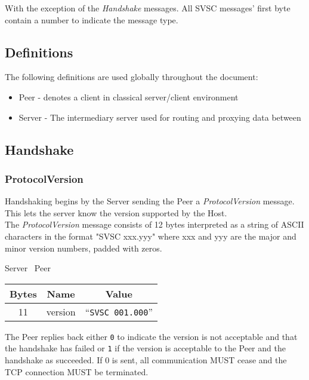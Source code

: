\documentclass{article}
\begin{document}
    With the exception of the \emph{Handshake} messages. All SVSC messages' first byte contain a number to indicate
    the message type.

    \subsection{Definitions}
    The following definitions are used globally throughout the document:

    \begin{itemize}
        \item Peer - denotes a client in classical server/client environment
        \item Server - The intermediary server used for routing and proxying data between
    \end{itemize}

    \subsection{Handshake}

    \subsubsection{ProtocolVersion}

    Handshaking begins by the Server sending the Peer a \emph{ProtocolVersion} message. This lets the server know
    the version supported by the Host.\\

    The \emph{ProtocolVersion} message consists of 12 bytes interpreted as a string of ASCII characters in the format
    "SVSC xxx.yyy" where xxx and yyy are the major and minor version numbers, padded with zeros.

    \begin{center}
        Server \textrightarrow\ Peer\\
        \begin{tabular}{|c|c|c|}
            \hline
            \textbf{Bytes} & \textbf{Name} & \textbf{Value}            \\
            \hline
            11             & version       & ``\texttt{SVSC 001.000}'' \\
            \hline
        \end{tabular}
    \end{center}

    The Peer replies back either \texttt{0} to indicate the version is not acceptable and that the handshake has
    failed or \texttt{1} if the version is acceptable to the Peer and the handshake as succeeded. If 0 is sent, all
    communication MUST cease and the TCP connection MUST be terminated.
\end{document}
